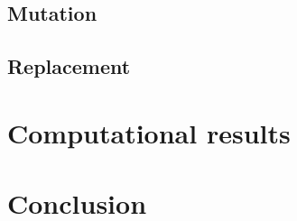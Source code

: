 \documentclass[onecolumn]{IEEEtran}
\begin{document}
\subsection{Mutation\label{ss:mutation}}

\subsection{Replacement}

\section{Computational results}

\section{Conclusion}



\end{document}
